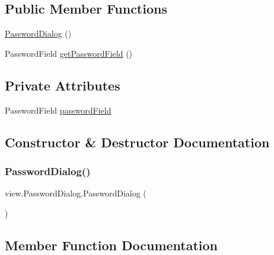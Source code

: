 \subsection*{Public Member Functions}
\begin{DoxyCompactItemize}
\item 
\mbox{\hyperlink{classview_1_1_password_dialog_a3d89577c28c929531d82b17eb37adc64}{Password\+Dialog}} ()
\item 
Password\+Field \mbox{\hyperlink{classview_1_1_password_dialog_a7d753f63d86a9c58ddfc06bb1f8f7d03}{get\+Password\+Field}} ()
\end{DoxyCompactItemize}
\subsection*{Private Attributes}
\begin{DoxyCompactItemize}
\item 
Password\+Field \mbox{\hyperlink{classview_1_1_password_dialog_a981d9b7d1f0586dca7ffe07421771b0b}{password\+Field}}
\end{DoxyCompactItemize}


\subsection{Constructor \& Destructor Documentation}
\mbox{\label{classview_1_1_password_dialog_a3d89577c28c929531d82b17eb37adc64}} 
\subsubsection{\texorpdfstring{Password\+Dialog()}{PasswordDialog()}}
{\footnotesize\ttfamily view.\+Password\+Dialog.\+Password\+Dialog (\begin{DoxyParamCaption}{ }\end{DoxyParamCaption})}



\subsection{Member Function Documentation}
\mbox{\label{classview_1_1_password_dialog_a7d753f63d86a9c58ddfc06bb1f8f7d03}} 
